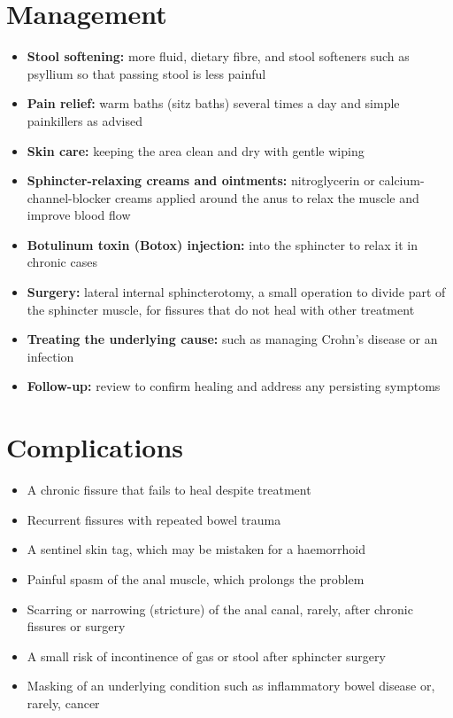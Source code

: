 \section*{Management}
\begin{itemize}
    \item \textbf{Stool softening:} more fluid, dietary fibre, and stool softeners such as psyllium so that passing stool is less painful
    \item \textbf{Pain relief:} warm baths (sitz baths) several times a day and simple painkillers as advised
    \item \textbf{Skin care:} keeping the area clean and dry with gentle wiping
    \item \textbf{Sphincter-relaxing creams and ointments:} nitroglycerin or calcium-channel-blocker creams applied around the anus to relax the muscle and improve blood flow
    \item \textbf{Botulinum toxin (Botox) injection:} into the sphincter to relax it in chronic cases
    \item \textbf{Surgery:} lateral internal sphincterotomy, a small operation to divide part of the sphincter muscle, for fissures that do not heal with other treatment
    \item \textbf{Treating the underlying cause:} such as managing Crohn's disease or an infection
    \item \textbf{Follow-up:} review to confirm healing and address any persisting symptoms
\end{itemize}

\section*{Complications}
\begin{itemize}
    \item A chronic fissure that fails to heal despite treatment
    \item Recurrent fissures with repeated bowel trauma
    \item A sentinel skin tag, which may be mistaken for a haemorrhoid
    \item Painful spasm of the anal muscle, which prolongs the problem
    \item Scarring or narrowing (stricture) of the anal canal, rarely, after chronic fissures or surgery
    \item A small risk of incontinence of gas or stool after sphincter surgery
    \item Masking of an underlying condition such as inflammatory bowel disease or, rarely, cancer
\end{itemize}

